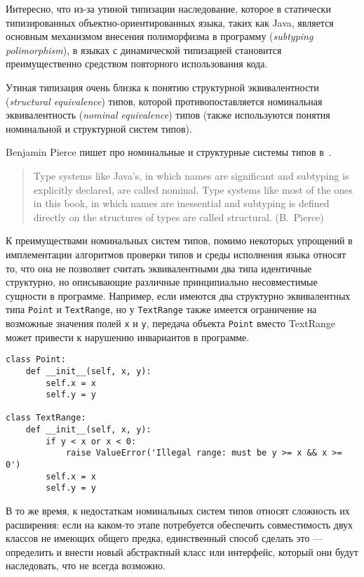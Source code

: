 Интересно, что из-за утиной типизации наследование, которое в статически
типизированных объектно-ориентированных языка, таких как Java, является
основным механизмом внесения полиморфизма в программу (\emph{subtyping polimorphism}),
в языках с динамической типизацией становится преимущественно средством
повторного использования кода.

Утиная типизация очень близка к понятию структурной эквивалентности
(\emph{structural equivalence}) типов, которой противопоставляется номинальная
эквивалентность (\emph{nominal equivalence}) типов (также используются понятия
номинальной и структурной систем типов).

Benjamin Pierce пишет про номинальные и структурные системы типов в~\cite{Pierce2002}.

\begin{quote}
Type systems like Java’s, in which names are significant and subtyping is
explicitly declared, are called nominal. Type systems like most of the ones in
this book, in which names are inessential and subtyping is defined directly on
the structures of types are called structural.
(B.~Pierce)
\end{quote}

К преимуществами номинальных систем типов, помимо некоторых упрощений в
имплементации алгоритмов проверки типов и среды исполнения языка относят то,
что она не позволяет считать эквивалентными два типа идентичные структурно, но
описывающие различные принципиально несовместимые сущности в программе.
Например, если имеются два структурно эквивалентных типа \texttt{Point} и
\texttt{TextRange}, но у \texttt{TextRange} также имеется ограничение на
возможные значения полей \texttt{x} и \texttt{y}, передача объекта \texttt{Point} вместо
TextRange может привести к нарушению инвариантов в программе.

\begin{lstlisting}
class Point:
    def __init__(self, x, y):
        self.x = x
        self.y = y

class TextRange:
    def __init__(self, x, y):
        if y < x or x < 0:
            raise ValueError('Illegal range: must be y >= x && x >= 0')
        self.x = x
        self.y = y
\end{lstlisting}

В то же время, к недостаткам номинальных систем типов относят сложность их
расширения: если на каком-то этапе потребуется обеспечить совместимость двух
классов не имеющих общего предка, единственный способ сделать это --- определить
и внести новый абстрактный класс или интерфейс, который они будут наследовать,
что не всегда возможно.  

